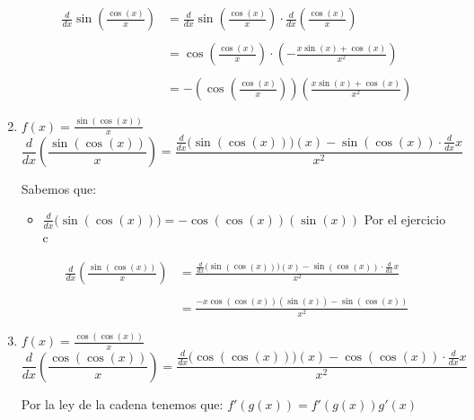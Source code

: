 \documentclass[12pt]{article}
\begin{document}
\begin{enumerate}[\hspace{9px} a)]
        \begin{align*}
            \displaystyle\frac{d}{dx}\sin\left(\frac{\cos(x)}{x}\right)&=\frac{d}{dx}\sin\left(\frac{\cos(x)}{x}\right)\cdot\frac{d}{dx}\left(\frac{\cos(x)}{x}\right)\\  \\
            &=\cos\left(\frac{\cos(x)}{x}\right)\cdot\left(-\frac{x\sin(x)+\cos(x)}{x^2}\right)\\ \\
            &=-\left(\cos\left(\frac{\cos(x)}{x}\right)\right)\left(\frac{x\sin(x)+\cos(x)}{x^2}\right)
        \end{align*}
    \item \(f(x) = \displaystyle\frac{\sin(\cos(x))}{x}\)\\

        \begin{equation*}
            \displaystyle\frac{d}{dx}\left(\frac{\sin(\cos(x))}{x}\right)=\frac{\displaystyle\frac{d}{dx}\big(\sin(\cos(x))\big)(x)-\sin(\cos(x))\cdot\frac{d}{dx}x}{x^2}
        \end{equation*}

        Sabemos que:
        \begin{itemize}
            \item \(\displaystyle\frac{d}{dx}\big(\sin(\cos(x))\big)=-\cos(\cos(x))(\sin(x))\) \quad Por el ejercicio c
        \end{itemize}
        \begin{align*}
            \displaystyle\frac{d}{dx}\left(\frac{\sin(\cos(x))}{x}\right)&=\frac{\displaystyle\frac{d}{dx}\big(\sin(\cos(x))\big)(x)-\sin(\cos(x))\cdot\frac{d}{dx}x}{x^2}\\ \\
            &=\frac{-x\cos(\cos(x))(\sin(x))-\sin(\cos(x))}{x^2}
        \end{align*}
    \item \(f(x) = \displaystyle\frac{\cos(\cos(x))}{x}\)\\

        \begin{equation*}
            \displaystyle\frac{d}{dx}\left(\frac{\cos(\cos(x))}{x}\right)=\frac{\displaystyle\frac{d}{dx}\big(\cos(\cos(x))\big)(x)-\cos(\cos(x))\cdot\frac{d}{dx}x}{x^2}
        \end{equation*}

        Por la ley de la cadena tenemos que: \(f'(g(x))=f'(g(x))g'(x)\)\medskip


\end{enumerate}
\end{document}
